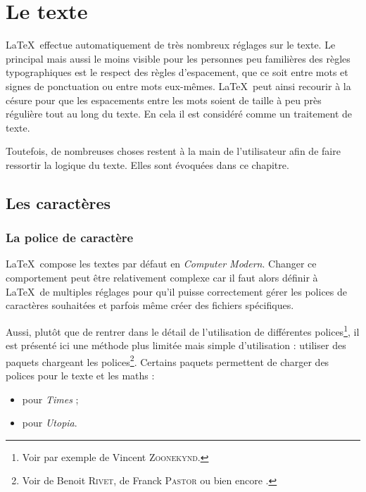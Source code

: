 
\chapter{Le texte} %

\LaTeX\ effectue automatiquement de très nombreux réglages sur le texte. Le principal mais aussi le moins visible pour les personnes peu familières des règles typographiques est le respect des règles d'espacement, que ce soit entre mots et signes de ponctuation ou entre mots eux-mêmes. \LaTeX\ peut ainsi recourir à la césure pour que les espacements entre les mots soient de taille à peu près régulière tout au long du texte. En cela il est considéré comme un traitement de texte. 

Toutefois, de nombreuses choses restent à la main de l'utilisateur afin de faire ressortir la logique du texte. Elles sont évoquées dans ce chapitre.

\section{Les caractères}\label{carac}

\subsection{La police de caractère}

\LaTeX\ compose les textes par défaut en  \emph{Computer Modern}. Changer ce comportement peut être relativement complexe car il faut alors définir à \LaTeX\ de multiples réglages pour qu'il puisse correctement gérer les polices de caractères souhaitées et parfois même créer des fichiers spécifiques.

Aussi, plutôt que de rentrer dans le détail de l'utilisation de différentes polices\footnote{Voir par exemple  de Vincent \textsc{Zoonekynd}.}, il est présenté ici une méthode plus limitée mais simple d'utilisation : utiliser des paquets chargeant les polices\footnote{Voir  de Benoit \textsc{Rivet},  de Franck \textsc{Pastor}\cite{past} ou bien encore .}. Certains paquets permettent de charger des polices pour le texte et les maths :
\begin{itemize}
\item {} pour \emph{Times} ;
\item {} pour \emph{Utopia}. \\
\end{itemize}

